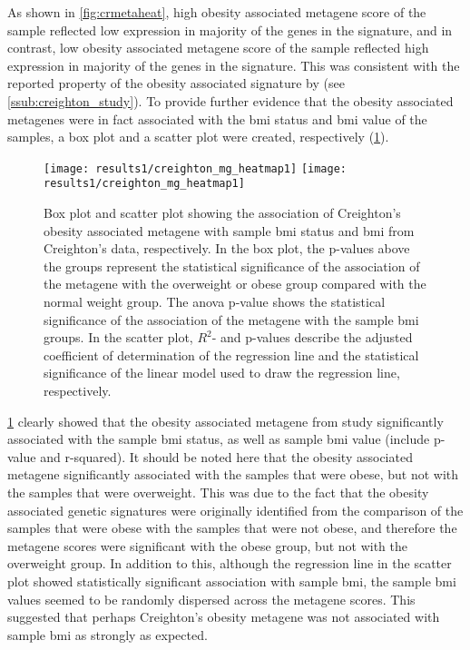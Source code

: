 As shown in \cref{fig:crmetaheat}, high obesity associated metagene score of the sample reflected low expression in majority of the genes in the signature, and in contrast, low obesity associated metagene score of the sample reflected high expression in majority of the genes in the signature.
This was consistent with the reported property of the obesity associated signature by \citet{Creighton2012} (see \cref{ssub:creighton_study}).
To provide further evidence that the obesity associated metagenes were in fact associated with the \gls{bmi} status and \gls{bmi} value of the samples, a box plot and a scatter plot were created, respectively (\cref{fig:crmetaboxplot}).

\begin{figure}[htp!]
	\centering
	\texttt{[image: results1/creighton\_mg\_heatmap1]}
	\hfill
	\texttt{[image: results1/creighton\_mg\_heatmap1]}
	\caption[Creighton's metagene and sample \gls{bmi}/\gls{bmi} status in Creighton's data]{Box plot and scatter plot showing the association of Creighton's obesity associated metagene with sample \gls{bmi} status and \gls{bmi} from Creighton's data, respectively.
	In the box plot, the p-values above the groups represent the statistical significance of the association of the metagene with the overweight or obese group compared with the normal weight group.
	The \gls{anova} p-value shows the statistical significance of the association of the metagene with the sample \gls{bmi} groups.
	In the scatter plot, $R^2$- and p-values describe the adjusted coefficient of determination of the regression line and the statistical significance of the linear model used to draw the regression line, respectively.}
	\label{fig:crmetaboxplot}
\end{figure}

\cref{fig:crmetaboxplot} clearly showed that the obesity associated metagene from \citet{Creighton2012} study significantly associated with the sample \gls{bmi} status, as well as sample \gls{bmi} value (include p-value and r-squared).
It should be noted here that the obesity associated metagene significantly associated with the samples that were obese, but not with the samples that were overweight.
This was due to the fact that the obesity associated genetic signatures were originally identified from the comparison of the samples that were obese with the samples that were not obese, and therefore the metagene scores were significant with the obese group, but not with the overweight group.
In addition to this, although the regression line in the scatter plot showed statistically significant association with sample \gls{bmi}, the sample \gls{bmi} values seemed to be randomly dispersed across the metagene scores.
This suggested that perhaps Creighton's obesity metagene was not associated with sample \gls{bmi} as strongly as expected.
\\

